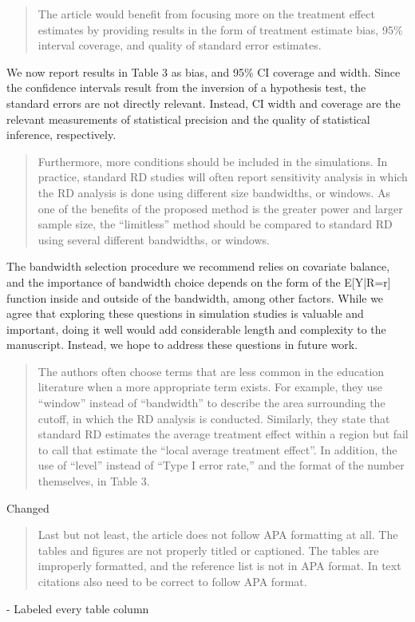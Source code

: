 \documentclass[12pt]{article}
\begin{document}
\begin{quote}
The article would benefit from focusing more on the treatment effect
estimates by providing results in the form of treatment estimate bias,
95\% interval coverage, and quality of standard error estimates.
\end{quote}
We now report results in Table 3 as bias, and 95\% CI coverage and
width. Since the confidence intervals result from the inversion of a
hypothesis test, the standard errors are not directly
relevant. Instead, CI width and coverage are the relevant measurements
of statistical precision and the quality of statistical inference,
respectively.

\begin{quote}
Furthermore, more conditions should be included in the simulations. In
practice, standard RD studies will often report sensitivity analysis
in which the RD analysis is done using different size bandwidths, or
windows. As one of the benefits of the proposed method is the greater
power and larger sample size, the “limitless” method should be
compared to standard RD using several different bandwidths, or
windows.
\end{quote}

The bandwidth selection procedure we recommend relies on covariate
balance, and the importance of bandwidth choice depends on the form of
the E[Y|R=r] function inside and outside of the bandwidth, among other
factors.
While we agree that exploring these questions in simulation studies is
valuable and important, doing it well would add considerable length
and complexity to the manuscript.
Instead, we hope to address these questions in future work.

\begin{quote}
The authors often choose terms that are less common in the education
literature when a more appropriate term exists. For example, they use
“window” instead of “bandwidth” to describe the area surrounding the
cutoff, in which the RD analysis is conducted. Similarly, they state
that standard RD estimates the average treatment effect within a
region but fail to call that estimate the “local average treatment
effect”. In addition, the use of “level” instead of “Type I error
rate,” and the format of the number themselves, in Table 3.
\end{quote}
Changed

\begin{quote}
Last but not least, the article does not follow APA formatting at
all. The tables and figures are not properly titled or captioned. The
tables are improperly formatted, and the reference list is not in APA
format. In text citations also need to be correct to follow APA
format.
\end{quote}
- Labeled every table column
\end{document}
